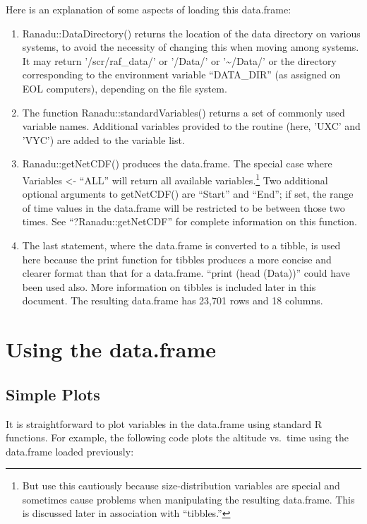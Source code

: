 \documentclass[12pt,english]{report}\usepackage[]{graphicx}\usepackage[]{color}
\begin{document}
Here is an explanation of some aspects of loading this data.frame:
\begin{enumerate}
\item Ranadu::DataDirectory() returns the location of the data directory
on various systems, to avoid the necessity of changing this when moving
among systems. It may return '/scr/raf\_data/' or '/Data/' or '\textasciitilde /Data/'
or the directory corresponding to the environment variable ``DATA\_DIR''
(as assigned on EOL computers), depending on the file system.
\item The function Ranadu::standardVariables() returns a set of commonly
used variable names. Additional variables provided to the routine
(here, 'UXC' and 'VYC') are added to the variable list.
\item Ranadu::getNetCDF() produces the data.frame. The special case where
Variables <- ``ALL'' will return all available variables.\footnote{But use this cautiously because size-distribution variables are special
and sometimes cause problems when manipulating the resulting data.frame.
This is discussed later in association with ``tibbles.''} Two additional optional arguments to getNetCDF() are ``Start''
and ``End''; if set, the range of time values in the data.frame
will be restricted to be between those two times. See ``?Ranadu::getNetCDF''
for complete information on this function.
\item The last statement, where the data.frame is converted to a tibble,
is used here because the print function for tibbles produces a more
concise and clearer format than that for a data.frame. ``print (head
(Data))'' could have been used also. More information on tibbles
is included later in this document. The resulting data.frame has 23,701
rows and 18 columns.
\end{enumerate}

\section{Using the data.frame}

\subsection{Simple Plots}

It is straightforward to plot variables in the data.frame using standard
R functions. For example, the following code plots the altitude vs.~time
using the data.frame loaded previously:
\end{document}
